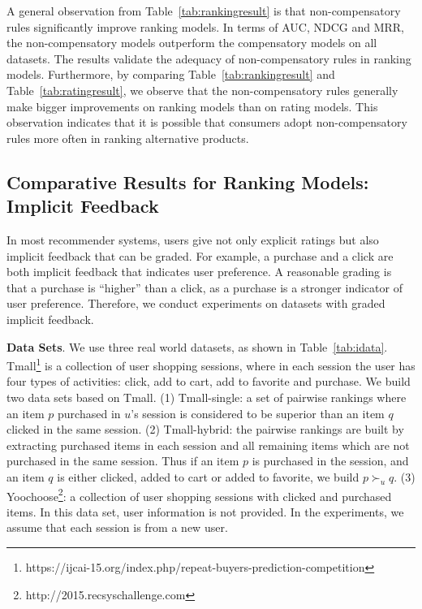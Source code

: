 \documentclass[letterpaper]{article} %
\begin{document}
A general observation from Table~\ref{tab:rankingresult} is that non-compensatory rules significantly improve ranking models. In terms of AUC, NDCG and MRR, the non-compensatory models outperform the compensatory models on all datasets. The results validate the adequacy of non-compensatory rules in ranking  models. Furthermore, by comparing Table~\ref{tab:rankingresult} and Table~\ref{tab:ratingresult}, we observe that the non-compensatory rules generally make bigger improvements on ranking models than on rating models. This observation indicates that it is possible that consumers adopt non-compensatory rules more often in ranking alternative products.
\subsection{Comparative Results for Ranking Models: Implicit Feedback}
In most recommender systems, users give not only explicit ratings but also implicit feedback that can be graded. For example, a purchase and a click are both implicit feedback that indicates user preference. A reasonable grading is that a purchase is ``higher'' than a click, as a purchase is a stronger indicator of user preference. Therefore, we conduct experiments on datasets with graded implicit feedback.  

\begin{table}[htp]
\caption{Statistics of Datasets with graded implicit feedback}
\centering
{}
\label{tab:idata}
\end{table}%

\textbf{Data Sets}. We use three real world datasets, as shown in Table~\ref{tab:idata}. Tmall\footnote{https://ijcai-15.org/index.php/repeat-buyers-prediction-competition} is a collection of user shopping sessions, where in each session the user has four types of activities: click, add to cart, add to favorite and purchase. We build two data sets based on Tmall. (1) Tmall-single: a set of pairwise rankings where an item $p$ purchased in $u$'s session is considered to be superior than an item $q$ clicked in the same session. (2) Tmall-hybrid: the pairwise rankings are built by extracting purchased items in each session and all remaining items which are not purchased in the same session. Thus if an item $p$ is purchased in the session, and an item $q$ is either clicked, added to cart or added to favorite, we build $p\succ_u q$. (3) Yoochoose\footnote{http://2015.recsyschallenge.com}: a collection of user shopping sessions with clicked and purchased items. In this data set, user information is not provided. In the experiments, we assume that each session is from a new user. 
\end{document}
